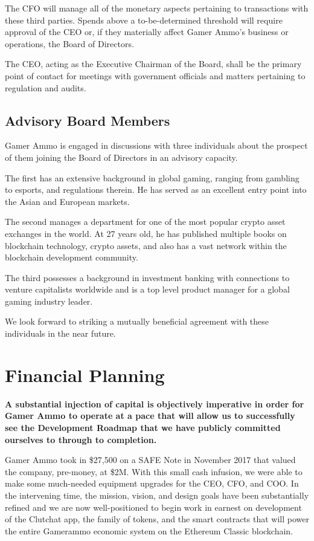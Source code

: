 \documentclass[11pt]{report}
\begin{document}
The CFO will manage all of the monetary aspects pertaining to transactions with these third parties. Spends above a to-be-determined threshold will require approval of the CEO or, if they materially affect Gamer Ammo's business or operations, the Board of Directors.

The CEO, acting as the Executive Chairman of the Board, shall be the primary point of contact for meetings with government officials and matters pertaining to regulation and audits.

\section{Advisory Board Members}
Gamer Ammo is engaged in discussions with three individuals about the prospect of them joining the Board of Directors in an advisory capacity.

The first has an extensive background in global gaming, ranging from gambling to esports, and regulations therein. He has served as an excellent entry point into the Asian and European markets.

The second manages a department for one of the most popular crypto asset exchanges in the world. At 27 years old, he has published multiple books on blockchain technology, crypto assets, and also has a vast network within the blockchain development community.

The third possesses a background in investment banking with connections to venture capitalists worldwide and is a top level product manager for a global gaming industry leader.

We look forward to striking a mutually beneficial agreement with these individuals in the near future.
\chapter{Financial Planning}
{\textbf{A substantial injection of capital is objectively imperative in order for Gamer Ammo to operate at a pace that will allow us to successfully see the Development Roadmap that we have publicly committed ourselves to through to completion.}}

Gamer Ammo took in \$27,500 on a SAFE Note\cite{safe-note} in November 2017 that valued the company, pre-money, at \$2M. With this small cash infusion, we were able to make some much-needed equipment upgrades for the CEO, CFO, and COO. In the intervening time, the mission, vision, and design goals have been substantially refined and we are now well-positioned to begin work in earnest on development of the Clutchat app, the family of tokens, and the smart contracts that will power the entire Gamerammo economic system on the Ethereum Classic blockchain.
\end{document}
